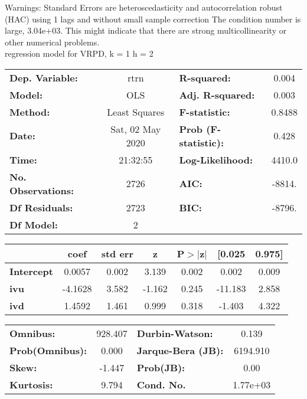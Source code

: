 Warnings: \newline
 [1] Standard Errors are heteroscedasticity and autocorrelation robust (HAC) using 1 lags and without small sample correction \newline
 [2] The condition number is large, 3.04e+03. This might indicate that there are \newline
 strong multicollinearity or other numerical problems.\\ 

regression model for VRPD, k = 1 h = 2\begin{center}
\begin{tabular}{lclc}
\toprule
\textbf{Dep. Variable:}    &       rtrn       & \textbf{  R-squared:         } &     0.004   \\
\textbf{Model:}            &       OLS        & \textbf{  Adj. R-squared:    } &     0.003   \\
\textbf{Method:}           &  Least Squares   & \textbf{  F-statistic:       } &    0.8488   \\
\textbf{Date:}             & Sat, 02 May 2020 & \textbf{  Prob (F-statistic):} &    0.428    \\
\textbf{Time:}             &     21:32:55     & \textbf{  Log-Likelihood:    } &    4410.0   \\
\textbf{No. Observations:} &        2726      & \textbf{  AIC:               } &    -8814.   \\
\textbf{Df Residuals:}     &        2723      & \textbf{  BIC:               } &    -8796.   \\
\textbf{Df Model:}         &           2      & \textbf{                     } &             \\
\bottomrule
\end{tabular}
\begin{tabular}{lcccccc}
                   & \textbf{coef} & \textbf{std err} & \textbf{z} & \textbf{P$> |$z$|$} & \textbf{[0.025} & \textbf{0.975]}  \\
\midrule
\textbf{Intercept} &       0.0057  &        0.002     &     3.139  &         0.002        &        0.002    &        0.009     \\
\textbf{ivu}       &      -4.1628  &        3.582     &    -1.162  &         0.245        &      -11.183    &        2.858     \\
\textbf{ivd}       &       1.4592  &        1.461     &     0.999  &         0.318        &       -1.403    &        4.322     \\
\bottomrule
\end{tabular}
\begin{tabular}{lclc}
\textbf{Omnibus:}       & 928.407 & \textbf{  Durbin-Watson:     } &    0.139  \\
\textbf{Prob(Omnibus):} &   0.000 & \textbf{  Jarque-Bera (JB):  } & 6194.910  \\
\textbf{Skew:}          &  -1.447 & \textbf{  Prob(JB):          } &     0.00  \\
\textbf{Kurtosis:}      &   9.794 & \textbf{  Cond. No.          } & 1.77e+03  \\
\bottomrule
\end{tabular}
\end{center}


